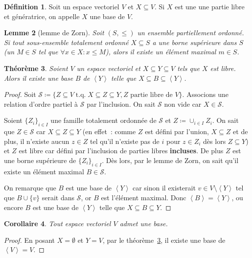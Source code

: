 \documentclass{article}
\DeclareMathOperator{\tq}{\text{ t.q. }}
\newcommand{\eng}[1]{\left\langle#1\right\rangle}
\newtheorem{thm}{Théorème}[section]
\newtheorem{cor}[thm]{Corollaire}
\newtheorem{lem}[thm]{Lemme}
\theoremstyle{definition}
\newtheorem{déf}[thm]{Définition}
\theoremstyle{remark}
\begin{document}
		\begin{déf} Soit un espace vectoriel $V$ et $X \subseteq V$. Si $X$ est une une partie libre et génératrice, on appelle $X$ une base de $V$. \end{déf}

		\begin{lem}[lemme de Zorn] Soit $(S, \leq)$ un ensemble partiellement ordonné. Si tout sous-ensemble totalement ordonné $X \subseteq S$ a une borne supérieure
		dans $S$ (un $M \in S$ tel que $\forall x \in X : x \leq M$), alors il existe un élément maximal $m \in S$. \end{lem}

		\begin{thm}\label{existenceBaseEspaceGénéré} Soient $V$ un espace vectoriel et $X \subseteq Y \subseteq V$ tels que $X$ est libre. Alors il existe une base
		$B$ de $\eng Y$ telle que $X \subseteq B \subseteq \eng Y$. \end{thm}

		\begin{proof} Soit $\mathcal S \coloneqq \{Z \subseteq V \tq X \subseteq Z \subseteq Y, Z \text{ partie libre de } V\}$. Associons une relation d'ordre partiel
		à $\mathcal S$ par l'inclusion. On sait $\mathcal S$ non vide car $X \in \mathcal S$.

		Soient $\{Z_i\}_{i \in I}$ une famille totalement ordonnée de $\mathcal S$ et $Z \coloneqq \cup_{i \in I}Z_i$. On sait que $Z \in \mathcal S$ car
		$X \subseteq Z \subseteq Y$ (en effet~: comme $Z$ est défini par l'union, $X \subseteq Z$ et de plus, il n'existe aucun $z \in Z$ tel qu'il n'existe pas de
		$i$ pour $z \in Z_i$ dès lors $Z \subseteq Y$) et $Z$ est libre car défini par l'inclusion de parties libres \textbf{incluses}. De plus $Z$ est une borne
		supérieure de $\{Z_i\}_{i \in I}$. Dès lors, par le lemme de Zorn, on sait qu'il existe un élément maximal $B \in \mathcal S$.

		On remarque que $B$ est une base de $\eng Y$ car sinon il existerait $v \in V \setminus \eng Y$ tel que $B \cup \{v\}$ serait dans $\mathcal S$, or $B$
		est l'élément maximal. Donc $\eng B = \eng Y$, ou encore $B$ est une base de $\eng Y$ telle que $X \subseteq B \subseteq Y$. \end{proof}

		\begin{cor} Tout espace vectoriel $V$ admet une base. \end{cor}

		\begin{proof} En posant $X = \emptyset$ et $Y = V$, par le théorème~\ref{existenceBaseEspaceGénéré}, il existe une base de $\eng V = V$. \end{proof}
\end{document}
